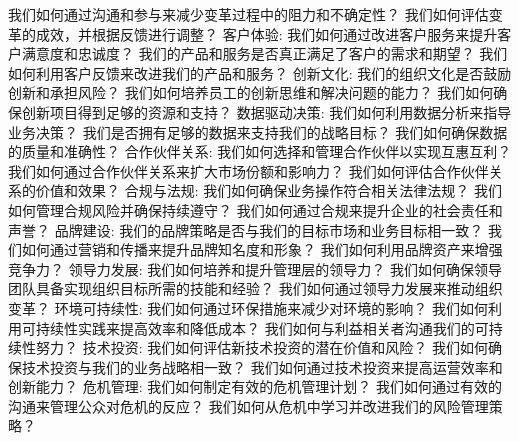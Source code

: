 \documentclass[12pt]{book}
\begin{document}
我们如何通过沟通和参与来减少变革过程中的阻力和不确定性？
我们如何评估变革的成效，并根据反馈进行调整？
客户体验:
我们如何通过改进客户服务来提升客户满意度和忠诚度？
我们的产品和服务是否真正满足了客户的需求和期望？
我们如何利用客户反馈来改进我们的产品和服务？
创新文化:
我们的组织文化是否鼓励创新和承担风险？
我们如何培养员工的创新思维和解决问题的能力？
我们如何确保创新项目得到足够的资源和支持？
数据驱动决策:
我们如何利用数据分析来指导业务决策？
我们是否拥有足够的数据来支持我们的战略目标？
我们如何确保数据的质量和准确性？
合作伙伴关系:
我们如何选择和管理合作伙伴以实现互惠互利？
我们如何通过合作伙伴关系来扩大市场份额和影响力？
我们如何评估合作伙伴关系的价值和效果？
合规与法规:
我们如何确保业务操作符合相关法律法规？
我们如何管理合规风险并确保持续遵守？
我们如何通过合规来提升企业的社会责任和声誉？
品牌建设:
我们的品牌策略是否与我们的目标市场和业务目标相一致？
我们如何通过营销和传播来提升品牌知名度和形象？
我们如何利用品牌资产来增强竞争力？
领导力发展:
我们如何培养和提升管理层的领导力？
我们如何确保领导团队具备实现组织目标所需的技能和经验？
我们如何通过领导力发展来推动组织变革？
环境可持续性:
我们如何通过环保措施来减少对环境的影响？
我们如何利用可持续性实践来提高效率和降低成本？
我们如何与利益相关者沟通我们的可持续性努力？
技术投资:
我们如何评估新技术投资的潜在价值和风险？
我们如何确保技术投资与我们的业务战略相一致？
我们如何通过技术投资来提高运营效率和创新能力？
危机管理:
我们如何制定有效的危机管理计划？
我们如何通过有效的沟通来管理公众对危机的反应？
我们如何从危机中学习并改进我们的风险管理策略？
\end{document}
